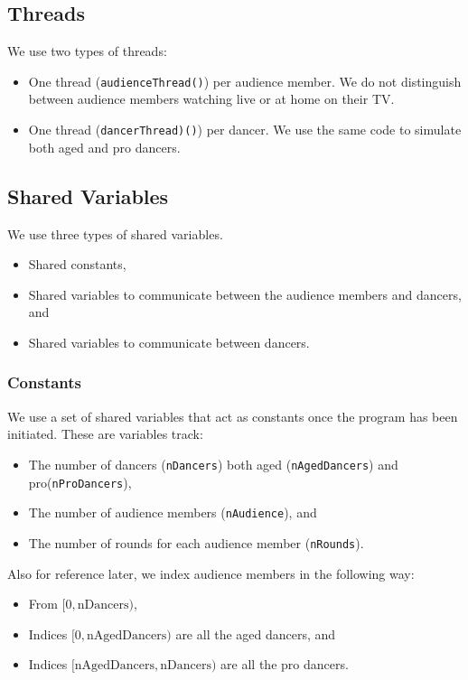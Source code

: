 \documentclass[12pt,a4paper]{scrartcl}
\begin{document}
\subsection{Threads}
We use two types of threads:
\begin{itemize}
    \item One thread (\texttt{audienceThread()}) per audience member.
          We do not distinguish between audience members watching live or at home on their TV.
    \item One thread (\texttt{dancerThread)()}) per dancer.
          We use the same code to simulate both aged and pro dancers.
\end{itemize}

\subsection{Shared Variables}
We use three types of shared variables.
\begin{itemize}
    \item Shared constants,
    \item Shared variables to communicate between the audience members and dancers, and
    \item Shared variables to communicate between dancers.
\end{itemize}

\subsubsection{Constants}
We use a set of shared variables that act as constants once the program has been initiated.
These are variables track:
\begin{itemize}
    \item The number of dancers (\texttt{nDancers}) both aged (\texttt{nAgedDancers}) and pro(\texttt{nProDancers}),
    \item The number of audience members (\texttt{nAudience}), and
    \item The number of rounds for each audience member (\texttt{nRounds}).
\end{itemize}

Also for reference later, we index audience members in the following way:
\begin{itemize}
    \item From $[0, \textrm{nDancers})$,
    \item Indices $[0, \textrm{nAgedDancers})$ are all the aged dancers, and
    \item Indices $[\textrm{nAgedDancers}, \textrm{nDancers})$ are all the pro dancers.
\end{itemize}
\end{document}
